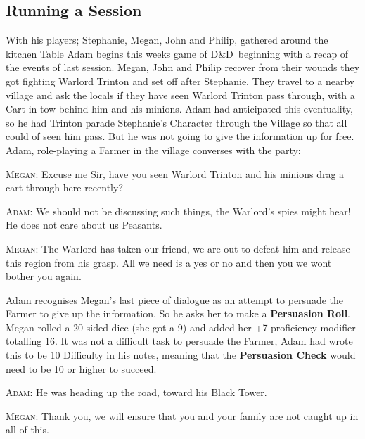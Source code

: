 \documentclass[review]{cmpreport}
\newcommand{\dnd}{D\&D}
\begin{document}
	\subsection{Running a Session} \label{DnDSeshExample}
	With his players; Stephanie, Megan, John and Philip, gathered around the kitchen Table Adam begins this weeks game of \dnd \ beginning with a recap of the events of last session. Megan, John and Philip recover from their wounds they got fighting Warlord Trinton and set off after Stephanie. They travel to a nearby village and ask the locals if they have seen Warlord Trinton pass through, with a Cart in tow behind him and his minions. Adam had anticipated this eventuality, so he had Trinton parade Stephanie's Character through the Village so that all could of seen him pass. But he was not going to give the information up for free. Adam, role-playing a Farmer in the village converses with the party:
	
	\textsc{Megan}: Excuse me Sir, have you seen Warlord Trinton and his minions drag a cart through here recently?
	
	\textsc{Adam}: We should not be discussing such things, the Warlord's spies might hear! He does not care about us Peasants.
	
	\textsc{Megan}: The Warlord has taken our friend, we are out to defeat him and release this region from his grasp. All we need is a yes or no and then you we wont bother you again.
	
	Adam recognises Megan's last piece of dialogue as an attempt to persuade the Farmer to give up the information. So he asks her to make a \textbf{Persuasion Roll}. Megan rolled a 20 sided dice (she got a 9) and added her +7 proficiency modifier totalling 16. It was not a difficult task to persuade the Farmer, Adam had wrote this to be 10 Difficulty in his notes, meaning that the \textbf{Persuasion Check} would need to be 10 or higher to succeed.
	
	\textsc{Adam}: He was heading up the road, toward his Black Tower. 
	
	\textsc{Megan}: Thank you, we will ensure that you and your family are not caught up in all of this.
	
\end{document}

